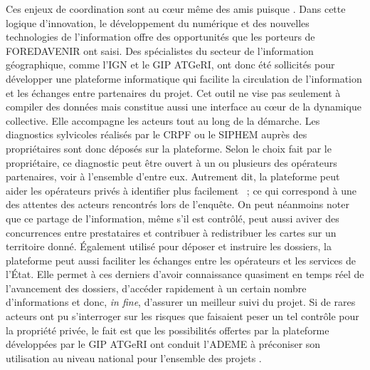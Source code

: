 \documentclass[12pt]{report}
\newcounter{table1}
\begin{document}
Ces enjeux de coordination sont au cœur même des \glspl{ami} puisque
. Dans cette logique d’innovation, le
développement du numérique et des nouvelles technologies de l’information offre
des opportunités que les porteurs de FOREDAVENIR ont saisi. Des
spécialistes du secteur de l’information géographique, comme l’IGN et le GIP
ATGeRI, ont donc été sollicités pour développer une plateforme informatique qui
facilite la circulation de l’information et les échanges entre partenaires du
projet. Cet outil ne vise pas seulement à compiler des données mais constitue aussi
une interface au c\oe{}ur de la dynamique collective. Elle accompagne les acteurs
tout au long de la démarche. Les diagnostics sylvicoles réalisés par le CRPF ou
le SIPHEM auprès des propriétaires sont donc déposés sur la plateforme. Selon
le choix fait par le propriétaire, ce diagnostic peut être ouvert à un ou
plusieurs des opérateurs partenaires, voir à l’ensemble d’entre eux. Autrement
dit, la plateforme peut aider les opérateurs privés à identifier plus facilement
~; ce qui correspond à une des attentes des
acteurs rencontrés lors de l’enquête. On peut néanmoins noter que ce partage de
l’information, même s’il est contrôlé, peut aussi aviver des concurrences entre
prestataires et contribuer à redistribuer les cartes sur un territoire donné.
Également utilisé pour déposer et instruire les dossiers, la plateforme peut
aussi faciliter les échanges entre les opérateurs et les services de l’État.
Elle permet à ces derniers d’avoir connaissance quasiment en temps réel de
l’avancement des dossiers, d’accéder rapidement à un certain nombre
d’informations et donc, \textit{in fine}, d’assurer un meilleur suivi du projet. Si de
rares acteurs ont pu s’interroger sur les risques que faisaient peser un tel
contrôle pour la propriété privée, le fait est que les possibilités offertes par
la plateforme développées par le GIP ATGeRI ont conduit l’ADEME à préconiser son
utilisation au niveau national pour l’ensemble des projets .\\ 
\end{document}

